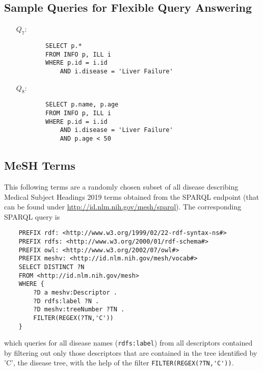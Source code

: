 \subsection{Sample Queries for Flexible Query Answering}
\label{app:flexqueries}

\begin{itemize}

    \item[$Q_7$:] \begin{verbatim}
        SELECT p.* 
        FROM INFO p, ILL i 
        WHERE p.id = i.id 
            AND i.disease = 'Liver Failure'
    \end{verbatim}
    
    \item[$Q_8$:] \begin{verbatim}
        SELECT p.name, p.age 
        FROM INFO p, ILL i 
        WHERE p.id = i.id 
            AND i.disease = 'Liver Failure'
            AND p.age < 50
    \end{verbatim}
    

\end{itemize}



\subsection{MeSH Terms}
\label{app:terms}

This following terms are a randomly chosen subset of all disease describing Medical Subject Headings 2019 terms obtained from the SPARQL endpoint 
(that can be found under \url{http://id.nlm.nih.gov/mesh/sparql}). The corresponding SPARQL query is
\begin{verbatim}
    PREFIX rdf: <http://www.w3.org/1999/02/22-rdf-syntax-ns#>
    PREFIX rdfs: <http://www.w3.org/2000/01/rdf-schema#>
    PREFIX owl: <http://www.w3.org/2002/07/owl#>
    PREFIX meshv: <http://id.nlm.nih.gov/mesh/vocab#>
    SELECT DISTINCT ?N
    FROM <http://id.nlm.nih.gov/mesh>
    WHERE { 
        ?D a meshv:Descriptor .
        ?D rdfs:label ?N .
        ?D meshv:treeNumber ?TN .
        FILTER(REGEX(?TN,'C'))
    }
\end{verbatim}
which queries for all disease names (\verb!rdfs:label!) from all descriptors contained by filtering out only those descriptors that are contained in the
tree identified by 'C', the disease tree, with the help of the filter \verb!FILTER(REGEX(?TN,'C'))!.

